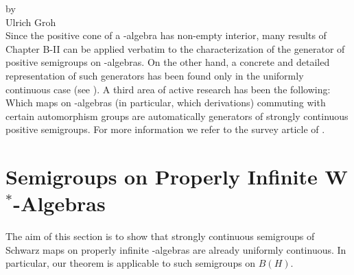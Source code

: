 \label{chap:d2}
{\Large
\vspace*{-.75cm}
by \\[.25em]
Ulrich Groh
\vspace{.75cm}
\\
}
Since the positive cone of a \CA-algebra has non-empty interior, many results of Chapter B-II can be applied verbatim to the characterization of the generator of positive semigroups on \CA-algebras.
On the other hand, a concrete and detailed representation of such generators has been found only in the uniformly continuous case (see \citet{lindblad:1976}).
A third area of active research has been the following: Which maps on \CA-algebras (in particular, which derivations) commuting with certain automorphism groups are automatically generators of strongly continuous positive semigroups.
For more information we refer to the survey article of \citet{evans:1984}.
\section{Semigroups on Properly Infinite \texorpdfstring{W$^{*}$}{W*}-Algebras}
The aim of this section is to show that strongly continuous semigroups of Schwarz maps on properly infinite \WA-algebras are already uniformly continuous.
In particular, our theorem is applicable to such semigroups on $B(H)$.

